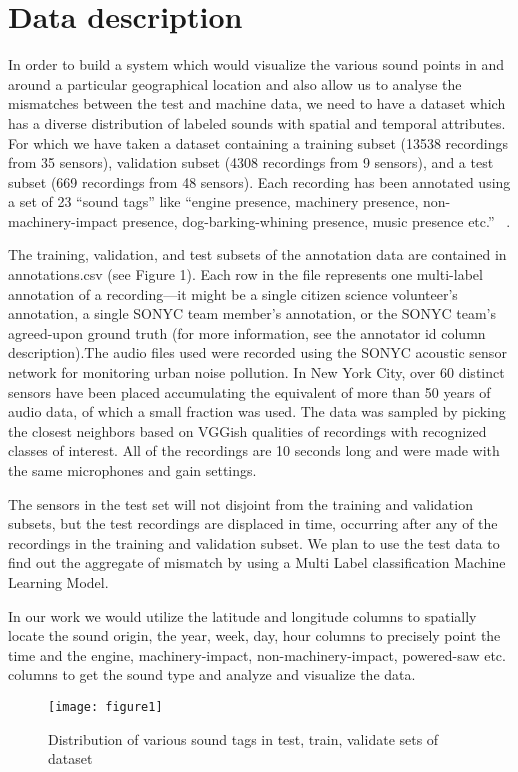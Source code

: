 \section{Data description}
In order to build a system which would visualize the various sound points in and around a particular geographical location and also allow us to analyse the mismatches between the test and machine data, we need to have a dataset which has a diverse distribution of labeled sounds with spatial and temporal attributes. For which we have taken a dataset containing a training subset (13538 recordings from 35 sensors), validation subset (4308 recordings from 9 sensors), and a test subset (669 recordings from 48 sensors). Each recording has been annotated using a set of 23 “sound tags” like “engine presence, machinery presence, non-machinery-impact presence, dog-barking-whining presence, music presence etc.”  ~\cite{4}.

The training, validation, and test subsets of the annotation data are contained in annotations.csv (see Figure 1). Each row in the file represents one multi-label annotation of a recording—it might be a single citizen science volunteer's annotation, a single SONYC team member's annotation, or the SONYC team's agreed-upon ground truth (for more information, see the annotator id column description).The audio files used were recorded using the SONYC acoustic sensor network for monitoring urban noise pollution. In New York City, over 60 distinct sensors have been placed accumulating the equivalent of more than 50 years of audio data, of which a small fraction was used. The data was sampled by picking the closest neighbors based on VGGish qualities of recordings with recognized classes of interest. All of the recordings are 10 seconds long and were made with the same microphones and gain settings. 

The sensors in the test set will not disjoint from the training and validation subsets, but the test recordings are displaced in time, occurring after any of the recordings in the training and validation subset. We plan to use the test data to find out the aggregate of mismatch by using a Multi Label classification Machine Learning Model.

In our work we would utilize the latitude and longitude columns to spatially locate the sound origin, the year, week, day, hour columns to precisely point the time and the engine, machinery-impact, non-machinery-impact, powered-saw etc. columns to get the sound type and analyze and visualize the data.
	\begin{figure}[h!]
		\texttt{[image: figure1]}
		\caption{Distribution of various sound tags in test, train, validate sets of     dataset}
	\end{figure}
	


	
	
	
	

	
	